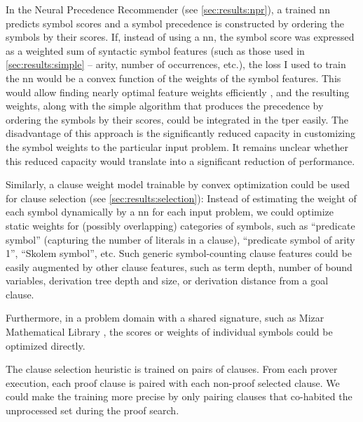 In the Neural Precedence Recommender (see \cref{sec:results:npr}),
a trained \gls{nn} predicts symbol scores and
a symbol precedence is constructed by ordering the symbols by their scores.
If, instead of using a \gls{nn}, the symbol score was expressed as a weighted sum of syntactic symbol features (such as those used in \cref{sec:results:simple} -- arity, number of occurrences, etc.),
the loss I used to train the \gls{nn} would be a convex function of the weights of the symbol features.
This would allow finding nearly optimal feature weights efficiently \cite{},
and the resulting weights, along with the simple algorithm that produces the precedence by ordering the symbols by their scores,
could be integrated in the \gls{tper} easily.
The disadvantage of this approach is the significantly reduced capacity in customizing the symbol weights to the particular input problem.
It remains unclear whether this reduced capacity would translate into a significant reduction of performance.

Similarly, a clause weight model trainable by convex optimization could be used for clause selection (see \cref{sec:results:selection}):
Instead of estimating the weight of each symbol dynamically by a \gls{nn} for each input problem,
we could optimize static weights for (possibly overlapping) categories of symbols,
such as
\enquote{predicate symbol} (capturing the number of literals in a clause),
\enquote{predicate symbol of arity 1},
\enquote{Skolem symbol}, etc.
Such generic symbol-counting clause features could be easily augmented by other clause features,
such as term depth, number of bound variables, derivation tree depth and size, or derivation distance from a goal clause.

Furthermore, in a problem domain with a shared signature, such as Mizar Mathematical Library \cite{},
the scores or weights of individual symbols could be optimized directly.

The clause selection heuristic is trained on pairs of clauses.
From each prover execution, each proof clause is paired with each non-proof selected clause.
We could make the training more precise by only pairing clauses that co-habited the unprocessed set during the proof search.

